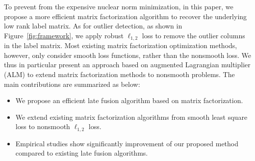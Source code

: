 \documentclass[letterpaper]{article}
\begin{document}




To prevent from the expensive nuclear norm minimization, in this paper, we propose a more efficient matrix factorization algorithm to recover the underlying low rank label matrix.
As for outlier detection, as shown in Figure~\ref{fig:framework}, we apply robust $\ell_{1,2}$ loss to remove the outlier columns in the label matrix.
Most existing matrix factorization optimization methods, however, only consider smooth loss functions, rather than the nonsmooth loss.
We thus in particular present an approach based on augmented Lagrangian multiplier (ALM) to extend matrix factorization methods to nonsmooth problems.
The main contributions are summarized as below:
\begin{itemize}
  \item We propose an efficient late fusion algorithm based on matrix factorization.
  \item We extend existing matrix factorization algorithms from smooth least square loss to nonsmooth $\ell_{1,2}$ loss.
  \item Empirical studies show significantly improvement of our proposed method compared to existing late fusion algorithms.
\end{itemize}
\end{document}
